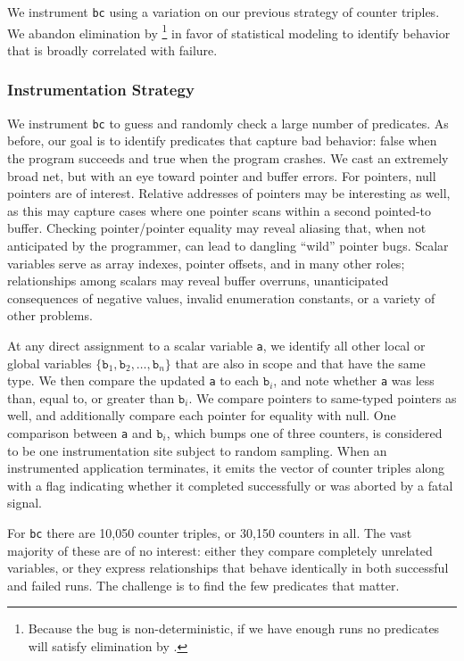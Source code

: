 We instrument \texttt{bc} using a variation on our previous strategy
of counter triples.  We abandon elimination by \footnote{Because the bug is non-deterministic, if we
have enough runs no predicates will satisfy elimination by
.} in favor of statistical modeling to
identify behavior that is broadly correlated with failure.

\subsubsection{Instrumentation Strategy}

We instrument \texttt{bc} to guess and randomly check a large number
of predicates.  As before, our goal is to identify predicates
that capture bad behavior: false when the program succeeds and true
when the program crashes.  We cast an extremely broad net, but with an
eye toward pointer and buffer errors.  For pointers,
null pointers are of interest.  Relative addresses of pointers
may be interesting as well, as this may capture cases where one
pointer scans within a second pointed-to buffer.  Checking
pointer/pointer equality may reveal aliasing that, when not
anticipated by the programmer, can lead to dangling ``wild'' pointer
bugs.  Scalar variables serve as array indexes, pointer offsets, and
in many other roles; relationships among scalars may reveal buffer
overruns, unanticipated consequences of negative values, invalid
enumeration constants, or a variety of other problems.

At any direct assignment to a scalar variable \texttt{a}, we identify
all other local or global variables $\{ \mathtt{b}_1, \mathtt{b}_2,
\dots, \mathtt{b}_n \}$ that are also in scope and that have the
same type.  We then compare the updated \texttt{a} to each
$\mathtt{b}_i$, and note whether \texttt{a} was less than, equal to,
or greater than $\mathtt{b}_i$.  We compare pointers to same-typed
pointers as well, and additionally compare each pointer for equality
with null.  One comparison between \texttt{a} and $\mathtt{b}_i$,
which bumps one of three counters, is considered to be one
instrumentation site subject to random sampling.  When an instrumented
application terminates, it emits the vector of counter triples along
with a flag indicating whether it completed successfully or was
aborted by a fatal signal.

For \texttt{bc} there are 10,050 counter triples, or 30,150 counters
in all.  The vast majority of these are of no interest: either they
compare completely unrelated variables, or they express relationships
that behave identically in both successful and failed runs.  The
challenge is to find the few predicates that matter.

